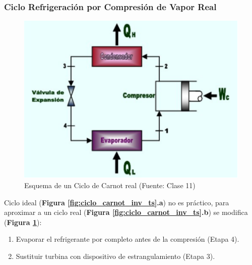         \subsubsection{Ciclo Refrigeración por Compresión de Vapor Real}
        
        \begin{multicols}{2}
            \begin{figure}
                \includegraphics[width=\textwidth]{img/clases/ciclo_carnot_inverso.png}
                \caption{Esquema de un Ciclo de Carnot real (Fuente: Clase 11)}
                \label{fig:ciclo_carnot_inv}
            \end{figure}
            
            Ciclo ideal (\textbf{Figura \ref{fig:ciclo_carnot_inv_ts}.a}) no es práctico, para aproximar a un ciclo real (\textbf{Figura \ref{fig:ciclo_carnot_inv_ts}.b}) se modifica (\textbf{Figura \ref{fig:ciclo_carnot_inv}}):
            \begin{enumerate}
                \item Evaporar el refrigerante por completo antes de la compresión (Etapa 4).
                \item Sustituir turbina con dispositivo de estrangulamiento (Etapa 3).
            \end{enumerate}
        \end{multicols}
        
